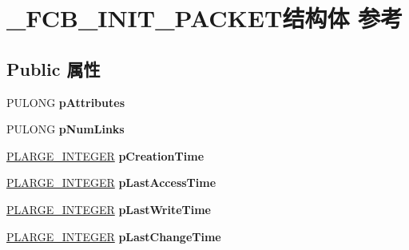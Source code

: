 \hypertarget{struct___f_c_b___i_n_i_t___p_a_c_k_e_t}{}\section{\+\_\+\+F\+C\+B\+\_\+\+I\+N\+I\+T\+\_\+\+P\+A\+C\+K\+E\+T结构体 参考}
\label{struct___f_c_b___i_n_i_t___p_a_c_k_e_t}
\subsection*{Public 属性}
\begin{DoxyCompactItemize}
\item 
\mbox{\label{struct___f_c_b___i_n_i_t___p_a_c_k_e_t_abfb02c446b573f4681896628747016c3}} 
P\+U\+L\+O\+NG {\bfseries p\+Attributes}
\item 
\mbox{\label{struct___f_c_b___i_n_i_t___p_a_c_k_e_t_aa9ba8f55b4baa3d79a9b86c67af07508}} 
P\+U\+L\+O\+NG {\bfseries p\+Num\+Links}
\item 
\mbox{\label{struct___f_c_b___i_n_i_t___p_a_c_k_e_t_acced7a1d85be0523fc149543d21d07dc}} 
\hyperlink{union___l_a_r_g_e___i_n_t_e_g_e_r}{P\+L\+A\+R\+G\+E\+\_\+\+I\+N\+T\+E\+G\+ER} {\bfseries p\+Creation\+Time}
\item 
\mbox{\label{struct___f_c_b___i_n_i_t___p_a_c_k_e_t_ac89accddf4d9536417b63bdb4a5ceada}} 
\hyperlink{union___l_a_r_g_e___i_n_t_e_g_e_r}{P\+L\+A\+R\+G\+E\+\_\+\+I\+N\+T\+E\+G\+ER} {\bfseries p\+Last\+Access\+Time}
\item 
\mbox{\label{struct___f_c_b___i_n_i_t___p_a_c_k_e_t_a6b74234f597228c71754ccfcf334c4a9}} 
\hyperlink{union___l_a_r_g_e___i_n_t_e_g_e_r}{P\+L\+A\+R\+G\+E\+\_\+\+I\+N\+T\+E\+G\+ER} {\bfseries p\+Last\+Write\+Time}
\item 
\mbox{\label{struct___f_c_b___i_n_i_t___p_a_c_k_e_t_a70e88a50b9872795f448c177d2105c68}} 
\hyperlink{union___l_a_r_g_e___i_n_t_e_g_e_r}{P\+L\+A\+R\+G\+E\+\_\+\+I\+N\+T\+E\+G\+ER} {\bfseries p\+Last\+Change\+Time}

\end{DoxyCompactItemize}
